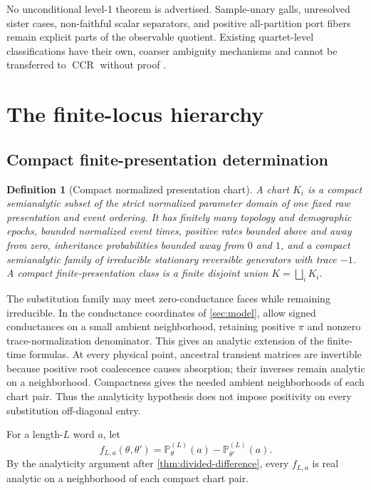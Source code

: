 \documentclass[11pt]{article}
\newtheorem{definition}[theorem]{Definition}
\newcommand{\CCR}{\operatorname{CCR}}
\begin{document}
No unconditional level-1 theorem is advertised.  Sample-unary galls, unresolved sister cases, non-faithful scalar separators, and positive all-partition port fibers remain explicit parts of the observable quotient.  Existing quartet-level classifications have their own, coarser ambiguity mechanisms and cannot be transferred to $\CCR$ without proof \citep{AllmanBanosGarroteRhodes2024}.

\section{The finite-locus hierarchy}
\label{sec:finite}

\subsection{Compact finite-presentation determination}

\begin{definition}[Compact normalized presentation chart]
A chart $K_i$ is a compact semianalytic subset of the strict normalized parameter domain of one fixed raw presentation and event ordering.  It has finitely many topology and demographic epochs, bounded normalized event times, positive rates bounded above and away from zero, inheritance probabilities bounded away from $0$ and $1$, and a compact semianalytic family of irreducible stationary reversible generators with trace $-1$.  A compact finite-presentation class is a finite disjoint union $K=\bigsqcup_iK_i$.
\end{definition}

The substitution family may meet zero-conductance faces while remaining irreducible.  In the conductance coordinates of \cref{sec:model}, allow signed conductances on a small ambient neighborhood, retaining positive $\pi$ and nonzero trace-normalization denominator.  This gives an analytic extension of the finite-time formulas.  At every physical point, ancestral transient matrices are invertible because positive root coalescence causes absorption; their inverses remain analytic on a neighborhood.  Compactness gives the needed ambient neighborhoods of each chart pair.  Thus the analyticity hypothesis does not impose positivity on every substitution off-diagonal entry.

For a length-$L$ word $a$, let
\[
f_{L,a}(\theta,\theta')=\mathbb P_\theta^{(L)}(a)-\mathbb P_{\theta'}^{(L)}(a).
\]
By the analyticity argument after \cref{thm:divided-difference}, every $f_{L,a}$ is real analytic on a neighborhood of each compact chart pair.
\end{document}
